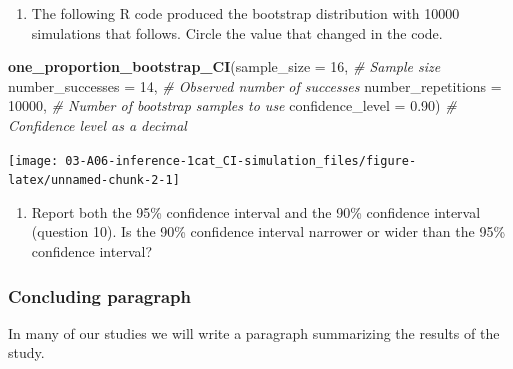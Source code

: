 \documentclass[
]{report}
\newenvironment{Shaded}{\begin{snugshade}}{\end{snugshade}}
\newcommand{\AttributeTok}[1]{\textcolor[rgb]{0.13,0.29,0.53}{#1}}
\newcommand{\CommentTok}[1]{\textcolor[rgb]{0.56,0.35,0.01}{\textit{#1}}}
\newcommand{\DecValTok}[1]{\textcolor[rgb]{0.00,0.00,0.81}{#1}}
\newcommand{\FloatTok}[1]{\textcolor[rgb]{0.00,0.00,0.81}{#1}}
\newcommand{\FunctionTok}[1]{\textcolor[rgb]{0.13,0.29,0.53}{\textbf{#1}}}
\newcommand{\NormalTok}[1]{#1}
\providecommand{\tightlist}{%
  \setlength{\itemsep}{0pt}\setlength{\parskip}{0pt}}
\begin{document}
\vspace{0.4in}

\begin{enumerate}
\def\labelenumi{\arabic{enumi}.}
\setcounter{enumi}{9}
\tightlist
\item
  The following R code produced the bootstrap distribution with 10000 simulations that follows. Circle the value that changed in the code.
\end{enumerate}

\begin{Shaded}
\begin{Highlighting}[]
\FunctionTok{one\_proportion\_bootstrap\_CI}\NormalTok{(}\AttributeTok{sample\_size =} \DecValTok{16}\NormalTok{, }\CommentTok{\# Sample size}
                    \AttributeTok{number\_successes =} \DecValTok{14}\NormalTok{, }\CommentTok{\# Observed number of successes}
                    \AttributeTok{number\_repetitions =} \DecValTok{10000}\NormalTok{, }\CommentTok{\# Number of bootstrap samples to use}
                    \AttributeTok{confidence\_level =} \FloatTok{0.90}\NormalTok{) }\CommentTok{\# Confidence level as a decimal}
\end{Highlighting}
\end{Shaded}

\begin{center}\texttt{[image: 03-A06-inference-1cat\_CI-simulation\_files/figure-latex/unnamed-chunk-2-1]} \end{center}

\begin{enumerate}
\def\labelenumi{\arabic{enumi}.}
\setcounter{enumi}{10}
\tightlist
\item
  Report both the 95\% confidence interval and the 90\% confidence interval (question 10). Is the 90\% confidence interval narrower or wider than the 95\% confidence interval?
\end{enumerate}

\vspace{0.5in}
\newpage

\subsubsection*{Concluding paragraph}\label{concluding-paragraph}

In many of our studies we will write a paragraph summarizing the results of the study.

\end{document}
